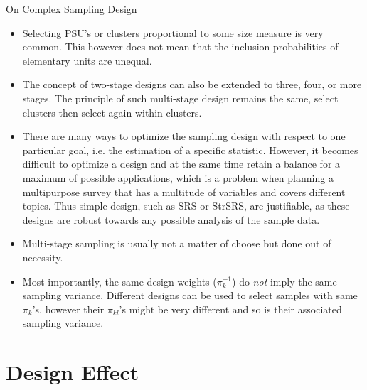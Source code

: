 \documentclass[10pt]{beamer}\usepackage[]{graphicx}\usepackage[]{color}
\begin{document}
\begin{frame}{On Complex Sampling Design}
\begin{itemize}
\item<1|only@1> Selecting PSU's or clusters proportional to some size measure is very common.
This however does not mean that the inclusion probabilities of elementary units are unequal.

\item<2|only@2>  The concept of two-stage designs can also be extended to three, four, or more stages.
The principle of such multi-stage design remains the same, select clusters then select again within clusters.

\item<3|only@3>  There are many ways to optimize the sampling design with respect to one particular goal, i.e. the estimation of a specific statistic. However, it becomes difficult to optimize a design and at the same time retain a balance for a maximum of possible applications, which is a problem when planning a multipurpose survey that has a multitude of variables and covers different topics.
Thus simple design,  such as SRS or StrSRS, are justifiable, as these designs are robust towards any possible analysis of the sample data.

\item<4|only@4>  Multi-stage sampling is usually not a matter of choose but done out of necessity.

\item<5|only@5>  Most importantly, the same design weights ($\pi_k^{-1}$) do \emph{not} imply the same sampling variance. Different designs can be used to select samples with same $\pi_k$'s, however their $\pi_{kl}$'s might be very different and so is their associated sampling variance.

\end{itemize}

\end{frame}

\section{Design Effect}
\end{document}
